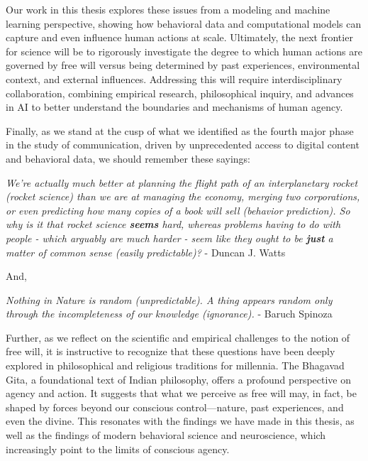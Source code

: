 \begin{enumerate}
    Our work in this thesis explores these issues from a modeling and machine learning perspective, showing how behavioral data and computational models can capture and even influence human actions at scale. Ultimately, the next frontier for science will be to rigorously investigate the degree to which human actions are governed by free will versus being determined by past experiences, environmental context, and external influences. Addressing this will require interdisciplinary collaboration, combining empirical research, philosophical inquiry, and advances in AI to better understand the boundaries and mechanisms of human agency.



\end{enumerate}



Finally, as we stand at the cusp of what we identified as the fourth major phase in the study of communication, driven by unprecedented access to digital content and behavioral data, we should remember these sayings:

\textit{We're actually much better at planning the flight path of an interplanetary rocket (rocket science) than we are at managing the economy, merging two corporations, or even predicting how many copies of a book will sell (behavior prediction). So why is it that rocket science \textbf{seems} hard, whereas problems having to do with people - which arguably are much harder - seem like they ought to be \textbf{just} a matter of common sense (easily predictable)?} - Duncan J. Watts       

\begin{center}
    And,
\end{center}

\textit{Nothing in Nature is random (unpredictable). A thing appears random only through the incompleteness of our knowledge (ignorance).} - Baruch Spinoza


Further, as we reflect on the scientific and empirical challenges to the notion of free will, it is instructive to recognize that these questions have been deeply explored in philosophical and religious traditions for millennia. The Bhagavad Gita, a foundational text of Indian philosophy, offers a profound perspective on agency and action. It suggests that what we perceive as free will may, in fact, be shaped by forces beyond our conscious control—nature, past experiences, and even the divine. This resonates with the findings we have made in this thesis, as well as the findings of modern behavioral science and neuroscience, which increasingly point to the limits of conscious agency.



